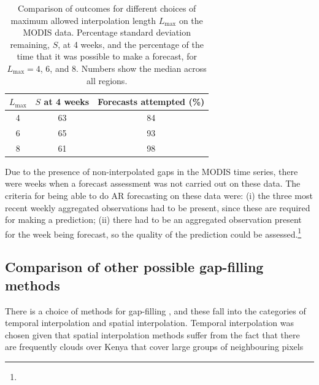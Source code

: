 \documentclass[review]{elsarticle}
\begin{document}
\begin{table}
	\caption{Comparison of outcomes for different choices of maximum allowed interpolation length $L_{\mathrm{max}}$ on the MODIS data. Percentage standard deviation remaining, $S$, at 4 weeks, and the percentage of the time that it was possible to make a forecast, for $L_{\mathrm{max}}=4$, 6, and 8. Numbers show the median across all regions.} \label{tab:IL choices}
	\centering
	\begin{tabular}{ccc} 
		\toprule
		\textbf{$L_{\mathrm{max}}$}    & \textbf{$S$ at 4 weeks}    & \textbf{Forecasts attempted (\%)}\\
		\midrule
		4  & 63 & 84 \\
		6  & 65 & 93 \\
		8 & 61 & 98 \\
		\bottomrule
	\end{tabular}
\end{table}

Due to the presence of non-interpolated gaps in the MODIS time series, there were weeks when a forecast assessment was not carried out on these data. The criteria for being able to do AR forecasting on these data were: (i) the three most recent weekly aggregated observations had to be present, since these are required for making a prediction; (ii) there had to be an aggregated observation present for the week being forecast, so the quality of the prediction could be assessed.\footnote{}


\subsection{Comparison of other possible gap-filling methods} \label{sec:compare}
{\color{red}There is a choice of methods for gap-filling \citep{bg-10-4055-2013, Weiss2014}, and these fall into the categories of temporal interpolation and spatial interpolation.} Temporal interpolation was chosen given that spatial interpolation methods suffer from the fact that there are frequently clouds over Kenya that cover large groups of neighbouring pixels 
\end{document}
